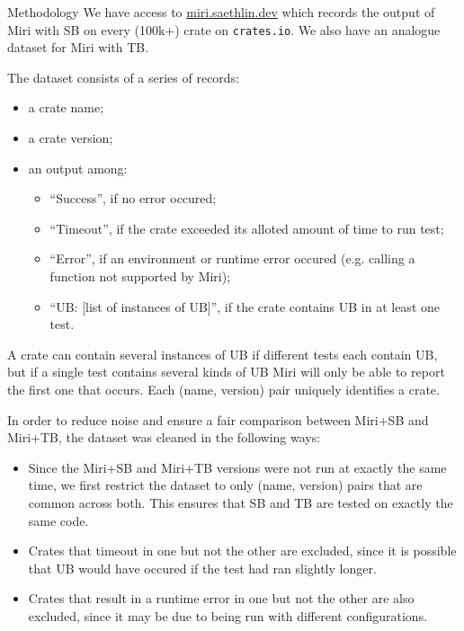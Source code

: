 \documentclass[a4paper,11pt]{article}
\theoremstyle{plain}
\theoremstyle{definition}
\theoremstyle{remark}
\begin{document}
\begin{paragraph}{Methodology}
    We have access to \href{https://miri.saethlin.dev/ub}{miri.saethlin.dev} which records the output of Miri with SB
    on every (100k+) crate on \texttt{crates.io}. We also have an analogue dataset for Miri with TB.

    The dataset consists of a series of records:
    \begin{itemize}
        \item a crate name;
        \item a crate version;
        \item an output among:
            \begin{itemize}
                \item ``Success'', if no error occured;
                \item ``Timeout'', if the crate exceeded its alloted amount of time to run test;
                \item ``Error'', if an environment or runtime error occured (e.g. calling a function not supported by Miri);
                \item ``UB: [list of instances of UB]'', if the crate contains UB in at least one test.
            \end{itemize}
    \end{itemize}
    A crate can contain several instances of UB if different tests each contain UB, but if a single test
    contains several kinds of UB Miri will only be able to report the first one that occurs.
    Each (name, version) pair uniquely identifies a crate.

    In order to reduce noise and ensure a fair comparison between Miri+SB and Miri+TB,
    the dataset was cleaned in the following ways:
    \begin{itemize}
        \item Since the Miri+SB and Miri+TB versions were not run at exactly the same time, we first restrict the
            dataset to only (name, version) pairs that are common across both. This ensures that SB and TB are
            tested on exactly the same code.
        \item Crates that timeout in one but not the other are excluded, since it is possible that UB would have occured
            if the test had ran slightly longer.
        \item Crates that result in a runtime error in one but not the other are also excluded,
            since it may be due to being run with different configurations.
    \end{itemize}


\end{paragraph}
\end{document}
